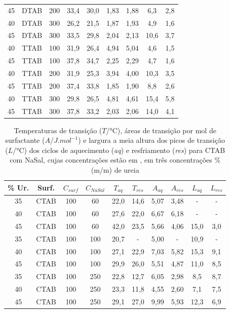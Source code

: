 \begin{table}[h]
{\begin{tabular}{ccccccccc}
    			45 & DTAB & 200 & 33,4 & 30,0 & 1,83 & 1,88 & 6,3 &	2,8\\
    			40 & DTAB & 300 & 26,2 & 21,5 & 1,87 & 1,93 & 4,9 &	1,6\\
    			45 & DTAB & 300 & 33,5 & 29,8 & 2,04 & 2,13 & 10,6 & 3,7\\
    			\midrule
    			40 & TTAB & 100 & 31,9 & 26,4 & 4,94 & 5,04 & 4,6 &	1,5\\
    			45 & TTAB & 100 & 37,8 & 34,7 & 2,25 & 2,29 & 4,7 &	1,6\\
    			40 & TTAB & 200 & 31,9 & 25,3 & 3,94 & 4,00 & 10,3 & 3,5\\
    			45 & TTAB & 200 & 37,4 & 33,8 & 1,85 & 1,90 & 8,8 &	2,6\\
    			40 & TTAB & 300 & 29,8 & 26,5 & 4,81 & 4,61 & 15,4 & 5,8\\
    			45 & TTAB & 300 & 37,8 & 33,2 & 2,03 & 2,06 & 14,0 & 4,1\\
                \bottomrule
                \end{tabular}}%
            {}
        \end{table}
        
        \begin{table}[H]
          \IBGEtab%
          {\caption{Temperaturas de transição ($T$/°C), áreas de transição por mol de surfactante ($A$/$J.mol^{-1}$) e largura a meia altura dos picos de transição ($L$/°C) dos ciclos de aquecimento (\emph{aq}) e resfriamento (\emph{res}) para CTAB com NaSal, cujas concentrações estão em \mM, em três concentrações \% (m/m) de ureia}
          \label{tab:DSC_temp_areas_NaSal}}%
            {\begin{tabular}{cccccccccc}
                \toprule
                \% Ur. & Surf. & $C_{surf}$ & $C_{NaSal}$ &
                $T_{aq}$ & $T_{res}$ & $A_{aq}$ & $A_{res}$ & $L_{aq}$ & $L_{res}$\\
       			\midrule
       			35 & CTAB & 100 & 60 & 22,0 & 14,6 & 5,07 & 3,48 & - & -\\
       			40 & CTAB & 100 & 60 & 27,6 & 22,0 & 6,67 & 6,18 & - & -\\
       			45 & CTAB & 100 & 60 & 42,0 & 23,5 & 5,66 & 4,06 & 15,0 & 3,0\\
       			35 & CTAB & 100 & 100 & 20,7 & - & 5,00 & - & 10,9 & -\\
       			40 & CTAB & 100 & 100 & 27,1 & 22,9 & 7,03 & 5,82 & 15,3 &	9,1\\
       			45 & CTAB & 100 & 100 & 29,9 & 26,0 & 5,51 & 4,87 & 11,0 &	8,5\\
       			35 & CTAB & 100 & 250 & 22,8 & 12,7 & 6,05 & 2,98 & 8,5 &	8,7\\
       			40 & CTAB & 100 & 250 & 23,3 & 11,8 & 4,55 & 2,60 & 7,1 &	7,5\\
       			45 & CTAB & 100 & 250 & 29,1 & 27,0 & 9,99 & 5,93 & 12,3 &	6,9\\
       			\bottomrule
            \end{tabular}}%
                {}
            \end{table}

